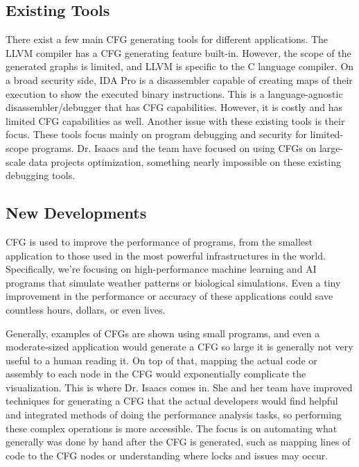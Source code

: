 \documentclass[journal,onecolumn]{IEEEtran}
\begin{document}
\subsection{Existing Tools}

There exist a few main CFG generating tools for different applications. The LLVM compiler has a CFG generating feature built-in. However, the scope of the generated graphs is limited, and LLVM is specific to the C language compiler. On a broad security side, IDA Pro is a disassembler capable of creating maps of their execution to show the executed binary instructions. This is a language-agnostic disassembler/debugger that has CFG capabilities. However, it is costly and has limited CFG capabilities as well. Another issue with these existing tools is their focus. These tools focus mainly on program debugging and security for limited-scope programs. Dr. Isaacs and the team have focused on using CFGs on large-scale data projects optimization, something nearly impossible on these existing debugging tools. 

\subsection{New Developments}

CFG is used to improve the performance of programs, from the smallest application to those used in the most powerful infrastructures in the world. Specifically, we're focusing on high-performance machine learning and AI programs that simulate weather patterns or biological simulations. Even a tiny improvement in the performance or accuracy of these applications could save countless hours, dollars, or even lives.

Generally, examples of CFGs are shown using small programs, and even a moderate-sized application would generate a CFG so large it is generally not very useful to a human reading it. On top of that, mapping the actual code or assembly to each node in the CFG would exponentially complicate the visualization. This is where Dr. Isaacs comes in. She and her team have improved techniques for generating a CFG that the actual developers would find helpful and integrated methods of doing the performance analysis tasks, so performing these complex operations is more accessible. The focus is on automating what generally was done by hand after the CFG is generated, such as mapping lines of code to the CFG nodes or understanding where locks and issues may occur. 
\end{document}
